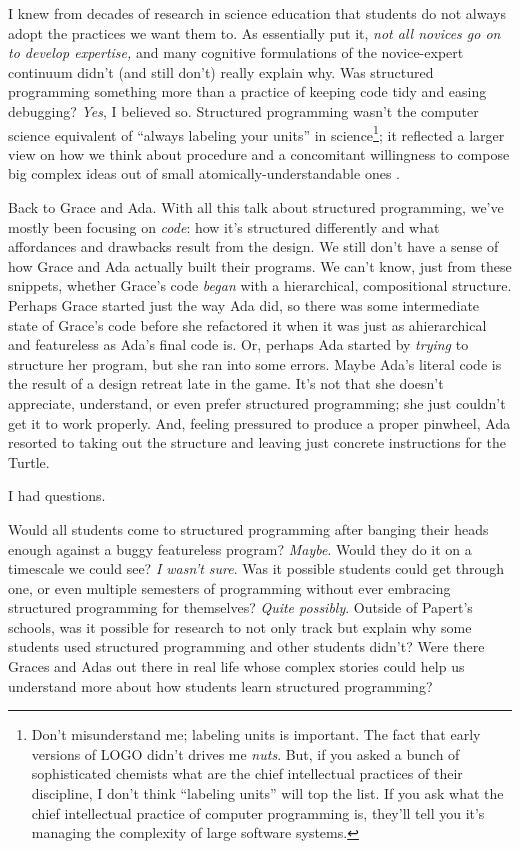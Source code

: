 I knew from decades of research in science education that students do not always adopt the practices we want them to. As \citep{hammer_students_1994} essentially put it, \emph{not all novices go on to develop expertise,} and many cognitive formulations of the novice-expert continuum didn't (and still don't) really explain why. Was structured programming something more than a practice of keeping code tidy and easing debugging? \emph{Yes}, I believed so. Structured programming wasn't the computer science equivalent of ``always labeling your units'' in science\footnote{Don't misunderstand me; labeling units is important. The fact that early versions of LOGO didn't drives me \emph{nuts}. But, if you asked a bunch of sophisticated chemists what are the chief intellectual practices of their discipline, I don't think ``labeling units'' will top the list. If you ask \citeyearpar{abelson_structure_1996} what the chief intellectual practice of computer programming is, they'll tell you it's managing the complexity of large software systems.}; it reflected a larger view on how we think about procedure and a concomitant willingness to compose big complex ideas out of small atomically-understandable ones \citep[\citet{papert_mindstorms_1980}]{abelson_structure_1996}.

Back to Grace and Ada. With all this talk about structured programming, we've mostly been focusing on \emph{code}: how it's structured differently and what affordances and drawbacks result from the design. We still don't have a sense of how Grace and Ada actually built their programs. We can't know, just from these snippets, whether Grace's code \emph{began} with a hierarchical, compositional structure. Perhaps Grace started just the way Ada did, so there was some intermediate state of Grace's code before she refactored it when it was just as ahierarchical and featureless as Ada's final code is. Or, perhaps Ada started by \emph{trying} to structure her program, but she ran into some errors. Maybe Ada's literal code is the result of a design retreat late in the game. It's not that she doesn't appreciate, understand, or even prefer structured programming; she just couldn't get it to work properly. And, feeling pressured to produce a proper pinwheel, Ada resorted to taking out the structure and leaving just concrete instructions for the Turtle.

I had questions.

Would all students come to structured programming after banging their heads enough against a buggy featureless program? \emph{Maybe}. Would they do it on a timescale we could see? \emph{I wasn't sure}. Was it possible students could get through one, or even multiple semesters of programming without ever embracing structured programming for themselves? \emph{Quite possibly}. Outside of Papert's \citeyearpar{papert_mindstorms_1980} schools, was it possible for research to not only track but explain why some students used structured programming and other students didn't? Were there Graces and Adas out there in real life whose complex stories could help us understand more about how students learn structured programming?


